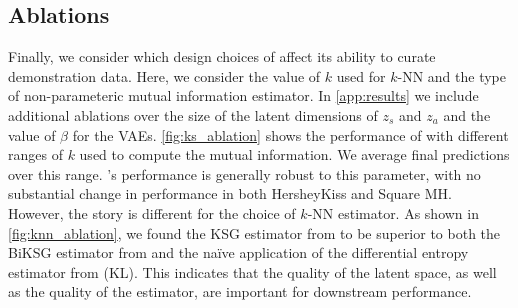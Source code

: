 \subsection{Ablations}
Finally, we consider which design choices of \abv affect its ability to curate demonstration data. Here, we consider the value of $k$ used for $k$-NN and the type of non-parameteric mutual information estimator. In \cref{app:results} we include additional ablations over the size of the latent dimensions of $z_s$ and $z_a$ and the value of $\beta$ for the VAEs. \cref{fig:ks_ablation} shows the performance of \abv with different ranges of $k$ used to compute the mutual information. We average final predictions over this range. \abv's performance is generally robust to this parameter, with no substantial change in performance in both HersheyKiss and Square MH. However, the story is different for the choice of $k$-NN estimator. As shown in \cref{fig:knn_ablation}, we found the KSG estimator from \citet{kraskov2004estimating} to be superior to both the BiKSG estimator from \citet{belghazi2018mutual} and the na\"ive application of the differential entropy estimator from \citet{kozachenko1987sample} (KL). This indicates that the quality of the latent space, as well as the quality of the estimator, are important for downstream performance.